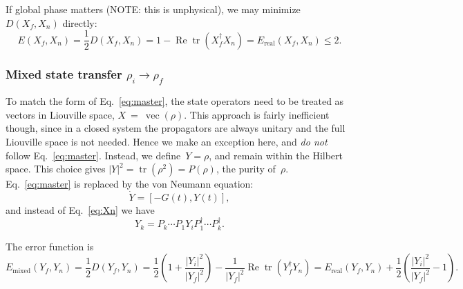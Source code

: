 \documentclass[aps, pra, a4paper, longbibliography]{revtex4}
\newcommand{\be}{\begin{equation}}
\newcommand{\ee}{\end{equation}}
\newcommand{\braket}[2]{\left \langle #1 | #2 \right \rangle}
\newcommand{\ketbra}[2]{\left| #1 \right \rangle \left \langle #2 \right|}
\newcommand{\comm}[2]{\left[ #1, #2 \right]}
\DeclareMathOperator{\tr}{tr}
\DeclareMathOperator{\re}{Re}
\DeclareMathOperator{\cvec}{vec}
\begin{document}
If global phase matters (NOTE: this is unphysical), we may minimize
$D(X_f, X_n)$ directly:
\be
E(X_f, X_n)
= \frac{1}{2} D(X_f, X_n)
= 1 -\re \tr(X_f^\dagger X_n)
= E_\text{real}(X_f, X_n) \le 2.
\ee



\subsubsection{Mixed state transfer $\rho_i \to \rho_f$}
\label{sec:closed-mixed}

To match the form of Eq.~\eqref{eq:master},
the state operators need to be treated as vectors in Liouville space,
$X~=~\cvec(\rho)$.
This approach is fairly inefficient though, since in a closed system the
propagators are always unitary and the full Liouville space is not
needed. Hence we make an exception here, and \emph{do not} follow Eq.~\eqref{eq:master}.
Instead, we define~$Y = \rho$, and remain within the Hilbert space.
This choice gives $|Y|^2 = \tr(\rho^2) = P(\rho)$, the purity of~$\rho$.
Eq.~\eqref{eq:master} is replaced by the von Neumann equation:
\be
\dot{Y} = \comm{-G(t)}{Y(t)},
\ee
and instead of Eq.~\eqref{eq:Xn} we have
\be
Y_k = P_k \cdots P_1 Y_i P_1^\dagger \cdots P_k^\dagger.
\ee

The error function is
\be
E_\text{mixed}(Y_f, Y_n)
= \frac{1}{2} D(Y_f, Y_n)
= \frac{1}{2}\left(1 +\frac{|Y_i|^2}{|Y_f|^2}\right) -\frac{1}{|Y_f|^2} \re \tr(Y_f^\dagger Y_n)
= E_\text{real}(Y_f, Y_n) +\frac{1}{2}\left(\frac{|Y_i|^2}{|Y_f|^2} -1\right).
\ee


\begin{comment}
The goal here is to minimize state operator distance
$D(X_f, X_n) = D(\rho_f, \rho_n)$.
$|X|^2$~is equivalent to the purity of the state:
\be
|X|^2
= |\cvec(\rho)|^2
= |\rho|^2
= \tr(\rho^2)
= P(\rho).
\ee
Unitary propagation conserves purity, hence (X1) holds, and we can
simply maximize the fidelity
\be
f(X_f, X_n)
= \frac{1}{P(\rho_f)} (\re) (\tr) \left( X_f^\dagger  P_n \cdots P_1 X_i \right).
\ee
Furthermore, the fidelity is strictly nonnegative since the
state operators are positive:
\be
0 \le f(X_f, X_n) \le \sqrt{\frac{P(\rho_i)}{P(\rho_f)}}.
\ee
If either $\rho_f$ or $\rho_i$ is pure,
$\rho = \ketbra{\psi}{\psi}$,
we have $|\rho|^2 = \braket{\psi}{\psi}^2 = 1$, and
the diagram simplifies by splitting up.
\end{comment}
\end{document}
